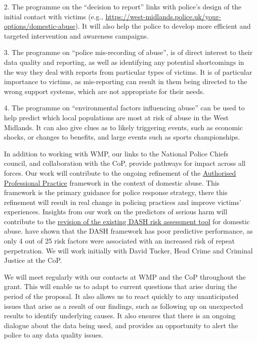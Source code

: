 \documentclass[11pt, a4paper]{article}
\begin{document}
2. The programme on the  ``decision to report'' links with police's design of the initial contact with victims (e.g., \url{https://west-midlands.police.uk/your-options/domestic-abuse}). It will also help the police to develop more efficient and targeted intervention and awareness campaigns.

3. The programme on ``police mis-recording of abuse'', is of direct interest to their data quality and reporting, as well as identifying any potential shortcomings in the way they deal with reports from particular types of victims. It is of particular importance to victims, as mis-reporting can result in them being directed to the wrong support systems, which are not appropriate for their needs.

4. The programme on ``environmental factors influencing abuse'' can be used to help predict which local populations are most at risk of abuse in the West Midlands. It can also give clues as to likely triggering events, such as economic shocks, or changes to benefits, and large events such as sports championships.

In addition to working with WMP, our links to the National Police Chiefs council, and collaboration with the CoP, provide pathways for impact across all forces. Our work will contribute to the ongoing refinement of the \href{https://www.app.college.police.uk/app-content/major-investigation-and-public-protection/domestic-abuse/introduction/)}{Authorised Professional Practice} framework in the context of domestic abuse. This framework is the primary guidance for police response strategy, there this refinement will result in real change in policing practices and improve victims' experiences. Insights from our work on the predictors of serious harm will contribute to the \href{https://whatworks.college.police.uk/Research/Documents/DA_risk_assessment_pilot.pdf}{revision of the existing DASH risk assessment tool} for domestic abuse.  have shown that the DASH framework has poor predictive performance, as only 4 out of 25 risk factors were associated with an increased risk of repeat perpetration. We will work initially with David Tucker, Head Crime and Criminal Justice at the CoP.

We will meet regularly with our contacts at WMP and the CoP throughout the grant. This will enable us to adapt to current questions that arise during the period of the proposal. It also allows us to react quickly to any unanticipated issues that arise as a result of our findings, such as following up on unexpected results to identify underlying causes. It also ensures that there is an ongoing dialogue about the data being used, and provides an opportunity to alert the police to any data quality issues.
\end{document}

